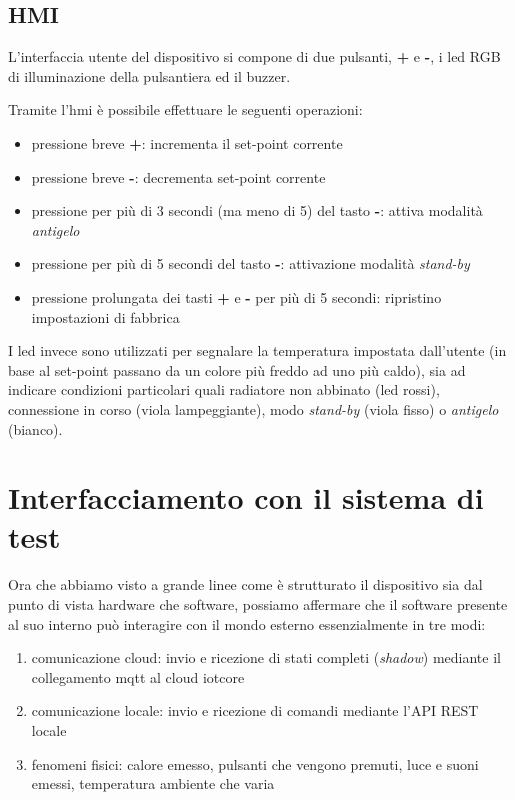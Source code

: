\documentclass[12pt,a4paper,twoside,titlepage]{book}
\begin{document}
\subsection{HMI}

L'interfaccia utente del dispositivo si compone di due pulsanti, \textbf{+} e \textbf{-},
i \acrshort{led} RGB di illuminazione della pulsantiera ed il buzzer.

Tramite l'\acrshort{hmi} è possibile effettuare le seguenti operazioni:

\begin{itemize}
    \item pressione breve \textbf{+}: incrementa il set-point corrente
    \item pressione breve \textbf{-}: decrementa set-point corrente
    \item pressione per più di 3 secondi (ma meno di 5) del tasto \textbf{-}:
        attiva modalità \textit{antigelo}
    \item pressione per più di 5 secondi del tasto \textbf{-}: attivazione modalità
        \textit{stand-by}
    \item pressione prolungata dei tasti \textbf{+} e \textbf{-} per più di 5 secondi:
        ripristino impostazioni di fabbrica
\end{itemize}

I \acrshort{led} invece sono utilizzati per segnalare la temperatura impostata dall'utente
(in base al set-point passano da un colore più freddo ad uno più caldo), sia ad
indicare condizioni particolari quali radiatore non abbinato (\acrshort{led} rossi), connessione
in corso (viola lampeggiante), modo \textit{stand-by} (viola fisso) o \textit{antigelo} (bianco).

\section{Interfacciamento con il sistema di test}

Ora che abbiamo visto a grande linee come è strutturato il dispositivo sia dal punto
di vista hardware che software, possiamo affermare che il software presente al suo interno
può interagire con il mondo esterno essenzialmente in tre modi:

\begin{enumerate}
    \item comunicazione cloud: invio e ricezione di stati completi (\textit{shadow})
        mediante il collegamento \Gls{mqtt} al cloud \Gls{iotcore}
    \item comunicazione locale: invio e ricezione di comandi mediante l'API REST locale
    \item fenomeni fisici: calore emesso, pulsanti che vengono premuti, luce e suoni
        emessi, temperatura ambiente che varia
\end{enumerate}
\end{document}
